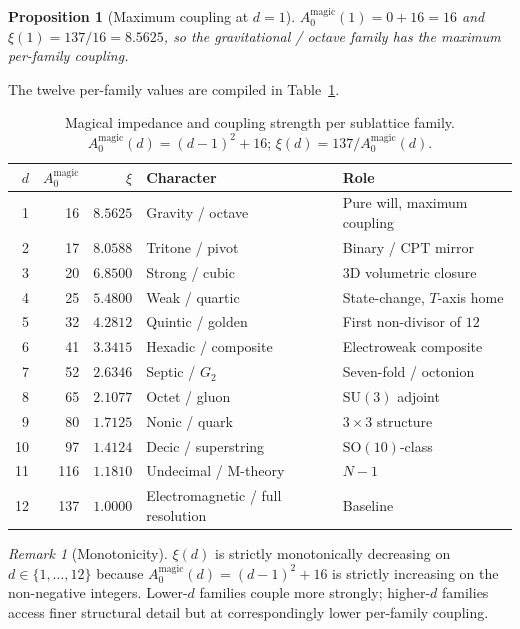 \documentclass[11pt,a4paper]{article}
\newtheorem{proposition}[theorem]{Proposition}
\theoremstyle{definition}
\theoremstyle{remark}
\newtheorem{remark}[theorem]{Remark}
\begin{document}
\begin{proposition}[Maximum coupling at $d=1$]\label{prop:max-coupling}
$A_{0}^{\text{magic}}(1) = 0 + 16 = 16$ and $\xi(1) = 137/16 = 8.5625$, so the gravitational / octave family has the maximum per-family coupling.
\end{proposition}

The twelve per-family values are compiled in Table~\ref{tab:impedance}.
\begin{table}[h]
\centering
\caption{Magical impedance and coupling strength per sublattice family. $A_{0}^{\text{magic}}(d) = (d-1)^{2} + 16$; $\xi(d) = 137/A_{0}^{\text{magic}}(d)$.}
\label{tab:impedance}
\begin{tabular}{@{}rrrll@{}}
\toprule
$d$ & $A_{0}^{\text{magic}}$ & $\xi$ & Character & Role \\
\midrule
 1 &  16 & $8.5625$ & Gravity / octave                & Pure will, maximum coupling \\
 2 &  17 & $8.0588$ & Tritone / pivot                 & Binary / CPT mirror \\
 3 &  20 & $6.8500$ & Strong / cubic                  & $3$D volumetric closure \\
 4 &  25 & $5.4800$ & Weak / quartic                  & State-change, $T$-axis home \\
 5 &  32 & $4.2812$ & Quintic / golden                & First non-divisor of $12$ \\
 6 &  41 & $3.3415$ & Hexadic / composite             & Electroweak composite \\
 7 &  52 & $2.6346$ & Septic / $G_{2}$                & Seven-fold / octonion \\
 8 &  65 & $2.1077$ & Octet / gluon                   & $\mathrm{SU}(3)$ adjoint \\
 9 &  80 & $1.7125$ & Nonic / quark                   & $3 \times 3$ structure \\
10 &  97 & $1.4124$ & Decic / superstring             & $\mathrm{SO}(10)$-class \\
11 & 116 & $1.1810$ & Undecimal / M-theory            & $N{-}1$ \\
12 & 137 & $1.0000$ & Electromagnetic / full resolution & Baseline \\
\bottomrule
\end{tabular}
\end{table}

\begin{remark}[Monotonicity]
$\xi(d)$ is strictly monotonically decreasing on $d\in\{1,\ldots,12\}$ because $A_{0}^{\text{magic}}(d) = (d-1)^{2}+16$ is strictly increasing on the non-negative integers. Lower-$d$ families couple more strongly; higher-$d$ families access finer structural detail but at correspondingly lower per-family coupling.
\end{remark}
\end{document}
